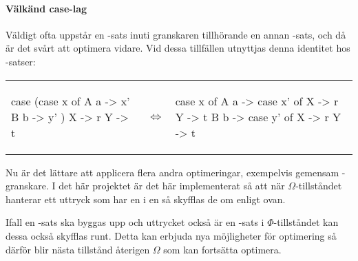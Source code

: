 \documentclass[../Optimise]{subfiles}
\begin{document}
\paragraph{Välkänd case-lag}
\label{sec:CaseLaw}

Väldigt ofta uppstår en -sats inuti granskaren tillhörande en annan 
-sats, och då är det svårt att optimera vidare.
Vid dessa tillfällen utnyttjas denna identitet hos -satser: \cite{santos}

\begin{tabular}{ m{5cm} m{0.5cm} m{5cm} }
\begin{codeEx}
 case (case x of
         A a -> x'
         B b -> y'
      )
   X -> r
   Y -> t
\end{codeEx}
	& $\Leftrightarrow$
	&
\begin{codeEx}
 case x of
     A a -> case x' of
              X -> r
              Y -> t
     B b -> case y' of
              X -> r
              Y -> t
\end{codeEx}
\\
\end{tabular}

Nu är det lättare att applicera flera andra optimeringar, 
exempelvis gemensam -granskare. 
I det här projektet är det här implementerat så att när $\Omega$-tillståndet hanterar ett 
uttryck som har en  i en  så skyfflas de om enligt ovan.

Ifall en -sats ska byggas upp och uttrycket också är en -sats i
$\Phi$-tillståndet kan dessa också skyfflas runt. Detta kan erbjuda nya möjligheter
för optimering så därför blir nästa tillstånd återigen $\Omega$ som kan fortsätta optimera.
\end{document}
